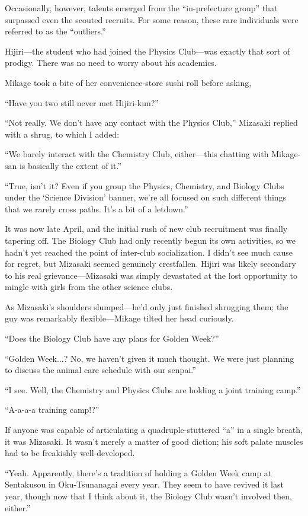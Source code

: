 \documentclass[
    a4paper,
    12pt,
    twoside,
    openany,
    UTF8,
    fontset=windows
]{ctexbook}
\begin{document}
Occasionally, however, talents emerged from the ``in-prefecture group'' that surpassed even the scouted recruits. For some reason, these rare individuals were referred to as the ``outliers.''

Hijiri---the student who had joined the Physics Club---was exactly that sort of prodigy. There was no need to worry about his academics.

Mikage took a bite of her convenience-store sushi roll before asking,

``Have you two still never met Hijiri-kun?''

``Not really. We don't have any contact with the Physics Club,'' Mizasaki replied with a shrug, to which I added:

``We barely interact with the Chemistry Club, either---this chatting with Mikage-san is basically the extent of it.''

``True, isn't it? Even if you group the Physics, Chemistry, and Biology Clubs under the `Science Division' banner, we're all focused on such different things that we rarely cross paths. It's a bit of a letdown.''

It was now late April, and the initial rush of new club recruitment was finally tapering off. The Biology Club had only recently begun its own activities, so we hadn't yet reached the point of inter-club socialization. I didn't see much cause for regret, but Mizasaki seemed genuinely crestfallen. Hijiri was likely secondary to his real grievance---Mizasaki was simply devastated at the lost opportunity to mingle with girls from the other science clubs.

As Mizasaki's shoulders slumped---he'd only just finished shrugging them; the guy was remarkably flexible---Mikage tilted her head curiously.

``Does the Biology Club have any plans for Golden Week?''

``Golden Week...? No, we haven't given it much thought. We were just planning to discuss the animal care schedule with our senpai.''

``I see. Well, the Chemistry and Physics Clubs are holding a joint training camp.''

``A-a-a-a training camp!?''

If anyone was capable of articulating a quadruple-stuttered ``a'' in a single breath, it was Mizasaki. It wasn't merely a matter of good diction; his soft palate muscles had to be freakishly well-developed.

``Yeah. Apparently, there's a tradition of holding a Golden Week camp at Sentakusou in Oku-Tsunanagai every year. They seem to have revived it last year, though now that I think about it, the Biology Club wasn't involved then, either.''
\end{document}
